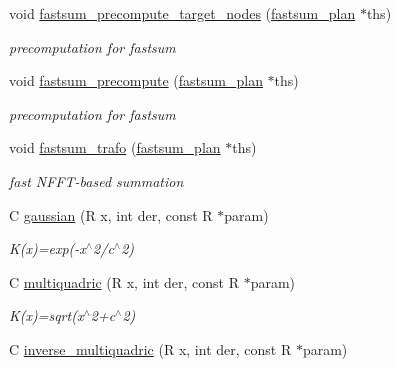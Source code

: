 \begin{DoxyCompactItemize}
void \hyperlink{group__applications__fastsum_ga9afba03e0a6cd6084ab837f90725c408}{fastsum\-\_\-precompute\-\_\-target\-\_\-nodes} (\hyperlink{group__applications__fastsum_gad953252f6b309404991c4afc7b98b34b}{fastsum\-\_\-plan} $\ast$ths)
\begin{DoxyCompactList}\small\item\em precomputation for fastsum \end{DoxyCompactList}\item 
void \hyperlink{group__applications__fastsum_ga197c16fcec7935886fc97d140f2b20ff}{fastsum\-\_\-precompute} (\hyperlink{group__applications__fastsum_gad953252f6b309404991c4afc7b98b34b}{fastsum\-\_\-plan} $\ast$ths)
\begin{DoxyCompactList}\small\item\em precomputation for fastsum \end{DoxyCompactList}\item 
void \hyperlink{group__applications__fastsum_gaab2cc691ba59064c18d439c9fd2185e8}{fastsum\-\_\-trafo} (\hyperlink{group__applications__fastsum_gad953252f6b309404991c4afc7b98b34b}{fastsum\-\_\-plan} $\ast$ths)
\begin{DoxyCompactList}\small\item\em fast N\-F\-F\-T-\/based summation \end{DoxyCompactList}\item 
\hypertarget{group__applications__fastsum_gadffb5b4ef80708bf867a66163e79ca07}{C \hyperlink{group__applications__fastsum_gadffb5b4ef80708bf867a66163e79ca07}{gaussian} (R x, int der, const R $\ast$param)}\label{group__applications__fastsum_gadffb5b4ef80708bf867a66163e79ca07}

\begin{DoxyCompactList}\small\item\em K(x)=exp(-\/x$^\wedge$2/c$^\wedge$2) \end{DoxyCompactList}\item 
\hypertarget{group__applications__fastsum_ga242a715403f8247f03c7ab2ed6ce2be2}{C \hyperlink{group__applications__fastsum_ga242a715403f8247f03c7ab2ed6ce2be2}{multiquadric} (R x, int der, const R $\ast$param)}\label{group__applications__fastsum_ga242a715403f8247f03c7ab2ed6ce2be2}

\begin{DoxyCompactList}\small\item\em K(x)=sqrt(x$^\wedge$2+c$^\wedge$2) \end{DoxyCompactList}\item 
\hypertarget{group__applications__fastsum_ga1afbbc441fa2ec9521cdf76a1215dc56}{C \hyperlink{group__applications__fastsum_ga1afbbc441fa2ec9521cdf76a1215dc56}{inverse\-\_\-multiquadric} (R x, int der, const R $\ast$param)}\label{group__applications__fastsum_ga1afbbc441fa2ec9521cdf76a1215dc56}


\end{DoxyCompactItemize}
